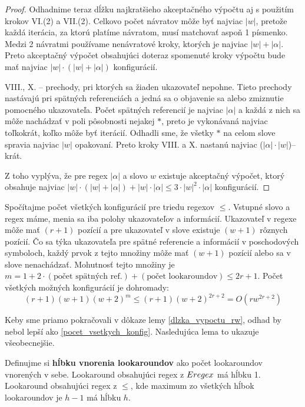 \begin{proof}
Odhadnime teraz dĺžku najkratšieho akceptačného výpočtu aj s použitím krokov VI.(2) a VII.(2). Celkovo počet návratov môže byť najviac $|w|$, pretože každá iterácia, za ktorú platíme návratom, musí matchovať aspoň 1 písmenko. Medzi 2 návratmi používame nenávratové kroky, ktorých je najviac $|w|+|\alpha|$. Preto akceptačný výpočet obsahujúci doteraz spomenuté kroky výpočtu bude mať najviac $|w|\cdot(|w|+|\alpha|)$ konfigurácií.

VIII., X. -- prechody, pri ktorých sa žiaden ukazovateľ nepohne. Tieto prechody nastávajú pri spätných referenciách a jedná sa o objavenie sa alebo zmiznutie pomocného ukazovateľa. Počet spätných referencií je najviac $|\alpha|$ a každá z nich sa môže nachádzať v poli pôsobnosti nejakej $*$, preto je vykonávaná najviac toľkokrát, koľko môže byť iterácií. Odhadli sme, že všetky $*$ na celom slove spravia najviac $|w|$ opakovaní. Preto kroky VIII. a X. nastanú najviac ($|\alpha|\cdot|w|$)--krát.

Z toho vyplýva, že pre regex $|\alpha|$ a slovo $w$ existuje akceptačný výpočet, ktorý obsahuje najviac $|w|\cdot(|w|+|\alpha|)+|w|\cdot|\alpha| \leq 3\cdot |w|^2 \cdot |\alpha| $ konfigurácií.
\end{proof}

Spočítajme počet všetkých konfigurácií pre triedu regexov $\le$. Vstupné slovo a regex máme, menia sa iba polohy ukazovateľov a informácií. Ukazovateľ v regexe môže mať $(r+1)$ pozícií a pre ukazovateľ v slove existuje $(w+1)$ rôznych pozícií. Čo sa týka ukazovateľa pre spätné referencie a informácií v poschodových symboloch, každý prvok z tejto množiny môže mať $(w+1)$ pozícií alebo sa v slove nenachádzať. Mohutnosť tejto množiny je $m = 1+2\cdot(\text{počet spätných ref.})+(\text{počet lookaroundov})\leq 2r+1$. Počet všetkých možných konfigurácií je dohromady: 
\begin{equation}\label{pocet_vsetkych_konfig}
(r+1)(w+1)(w+2)^m \leq (r+1)(w+2)^{2r+2} = O(rw^{2r+2})
\end{equation}

Keby sme priamo pokračovali v dôkaze lemy \ref{dlzka_vypoctu_rw}, odhad by nebol lepší ako \ref{pocet_vsetkych_konfig}. Nasledujúca lema to ukazuje všeobecnejšie.

Definujme si \textbf{hĺbku vnorenia lookaroundov} ako počet lookaroundov vnorených v sebe. Lookaround obsahujúci regex z $Eregex$ má hĺbku 1. Lookaround obsahujúci regex z $\le$, kde maximum zo všetkých hĺbok lookaroundov je $h-1$ má hĺbku $h$.

